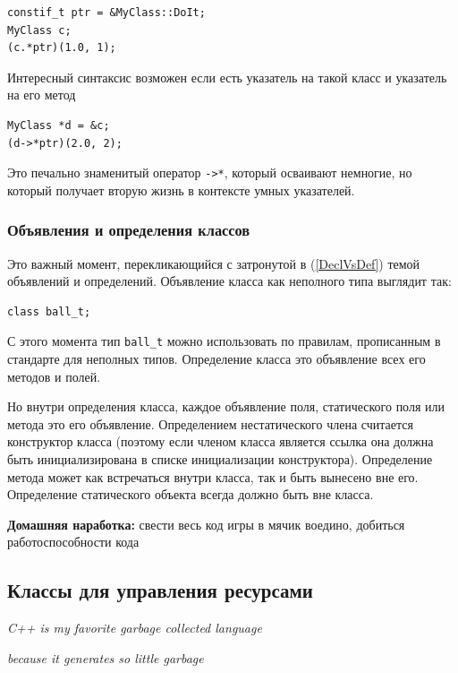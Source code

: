 \documentclass[a4paper,12pt,oneside]{article}
\begin{document}
\begin{lstlisting}
constif_t ptr = &MyClass::DoIt;
MyClass c;
(c.*ptr)(1.0, 1);
\end{lstlisting}

Интересный синтаксис возможен если есть указатель на такой класс и указатель на его метод

\begin{lstlisting}
MyClass *d = &c;
(d->*ptr)(2.0, 2);
\end{lstlisting}

Это печально знаменитый оператор \lstinline!->*!, который осваивают немногие, но который получает вторую жизнь в контексте умных указателей.

\subsubsection{Объявления и определения классов}\label{DeclDefs}

Это важный момент, перекликающийся с затронутой в (\ref{DeclVsDef}) темой объявлений и определений. Объявление класса как неполного типа выглядит так:

\begin{lstlisting}
class ball_t;
\end{lstlisting}

С этого момента тип \lstinline!ball_t! можно использовать по правилам, прописанным в стандарте для неполных типов. Определение класса это объявление всех его методов и полей.

Но внутри определения класса, каждое объявление поля, статического поля или метода это его объявление. Определением нестатического члена считается конструктор класса (поэтому если членом класса является ссылка она должна быть инициализирована в списке инициализации конструктора). Определение метода может как встречаться внутри класса, так и быть вынесено вне его. Определение статического объекта всегда должно быть вне класса.

\textbf{Домашняя наработка:} свести весь код игры в мячик воедино, добиться работоспособности кода

\pagebreak
\subsection{Классы для управления ресурсами}\label{WrapClasses}

\hfill\textit{C++ is my favorite garbage collected language}

\hfill\textit{because it generates so little garbage}{\vspace{0.5em}}
\end{document}
